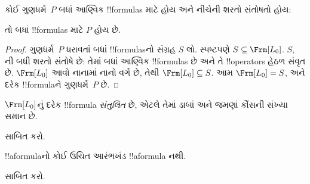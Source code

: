 \documentclass[../../../include/open-logic-section]{subfiles}
\begin{document}


\begin{thm}
  કોઈ ગુણધર્મ~$P$ બધાં આણ્વિક !!{formula}s માટે હોય અને નીચેની
  શરતો સંતોષતો હોય:
  \begin{enumerate}
  \end{enumerate}
  તો બધાં !!{formula}s માટે $P$ હોય છે.
\end{thm}

\begin{proof}
  ગુણધર્મ~$P$ ધરાવતાં બધાં !!{formula}sનો સંગ્રહ $S$ લો. સ્પષ્ટપણે
  $S \subseteq \Frm[L_0]$. $S$, ની બધી
  શરતો સંતોષે છે: તેમાં બધાં આણ્વિક !!{formula}s છે અને તે
  !!{operator}s હેઠળ સંવૃત છે. $\Frm[L_0]$ આવો નાનામાં નાનો વર્ગ છે,
  તેથી $\Frm[L_0] \subseteq S$. આમ $\Frm[L_0]=S$, અને દરેક !!{formula}ને
  ગુણધર્મ~$P$ છે.
\end{proof}

\begin{prop}
   $\Frm[L_0]$નું દરેક !!{formula} \emph{સંતુલિત} છે, એટલે તેમાં
   ડાબાં અને જમણાં કૌંસની સંખ્યા સમાન છે.
\end{prop}

\begin{prob}
 સાબિત કરો.
\end{prob}

\begin{prop} 
!!a{formula}નો કોઈ ઉચિત આરંભખંડ !!a{formula} નથી.
\end{prop}

\begin{prob}
   સાબિત કરો.
\end{prob}
\end{document}
